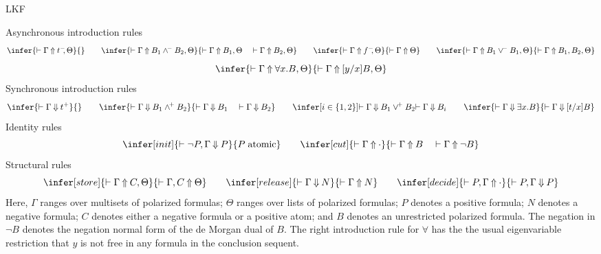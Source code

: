 \calculusAcronym{\LKF}



\maketitle

\begin{entry}{LKF}  

\newcommand{\true}{\hbox{\sl t}}
\newcommand{\false}{\hbox{\sl f}}
\newcommand{\truen}{t^-}
\newcommand{\truep}{t^+}
\newcommand{\falsen}{f^-}
\newcommand{\falsep}{f^+}
\newcommand{\wedgep}{\wedge^{\!+}}
\newcommand{\wedgen}{\wedge^{\!-}}
\newcommand{\veep}{\vee^{\!+}}
\newcommand{\veen}{\vee^{\!-}}

\newcommand{\async}[2]{\vdash#1\mathbin{\Uparrow}   #2}
\newcommand{\sync }[2]{\vdash#1\mathbin{\Downarrow} #2}

\begin{calculus}
{\sc Asynchronous introduction rules}
\[
\infer{\async{\Gamma}{\truen\kern-3pt,\Theta}}{}
\qquad
\infer{\async{\Gamma}{B_1\wedgen B_2,\Theta}}
      {\async{\Gamma}{B_1,\Theta}\quad \async{\Gamma}{B_2,\Theta}}
\qquad
\infer{\async{\Gamma}{\falsen\kern-3pt,\Theta}}{\async{\Gamma}{\Theta}}
\qquad
\infer{\async{\Gamma}{B_1\veen B_1,\Theta}}{\async{\Gamma}{B_1,B_2,\Theta}}
\]
\[
\infer{\async{\Gamma}{\forall x.B,\Theta}}{\async{\Gamma}{[y/x]B,\Theta}}
\]
{\sc Synchronous introduction rules}
\[
\infer{\sync{\Gamma}{\truep}}{}
\qquad
\infer{\sync{\Gamma}{B_1\wedgep B_2}}
      {\sync{\Gamma}{B_1}\quad\sync{\Gamma}{B_2}}
\qquad
\infer[i \in \{1,2\}]{\sync{\Gamma}{B_1\veep B_2}}{\sync{\Gamma}{B_i}}
\qquad
\infer{\sync{\Gamma}{\exists x.B}}{\sync{\Gamma}{[t/x]B}}
\]
{\sc Identity rules}
\[
\infer[init]{\sync{\neg P,\Gamma}{P}}{P \; \mbox{atomic}}
\qquad
\infer[cut]{\async{\Gamma}{\cdot}}{\async{\Gamma}{B}\quad \async{\Gamma}{\neg{B}}}
\]
{\sc Structural rules}
\[
\infer[store]{\async{\Gamma}{C,\Theta}}{\async{\Gamma,C}{\Theta}}
\qquad
\infer[release]{\sync{\Gamma}{N}}{\async{\Gamma}{N}}
\qquad
\infer[decide]{\async{P,\Gamma}{\cdot}}{\sync{P,\Gamma}{P}}
\]
Here,
$\Gamma$ ranges over multisets of polarized formulas;
$\Theta$ ranges over lists of polarized formulas;
$P$ denotes a positive formula;
$N$ denotes a negative formula;
$C$ denotes either a negative formula or a positive atom; and
$B$ denotes an unrestricted polarized formula.
The negation in $\neg B$ denotes the negation normal form of the de
Morgan dual of $B$.
The right introduction rule for $\forall$ has the the usual
eigenvariable restriction that $y$ is not free in any formula in the
conclusion sequent.
\end{calculus}


\end{entry}
